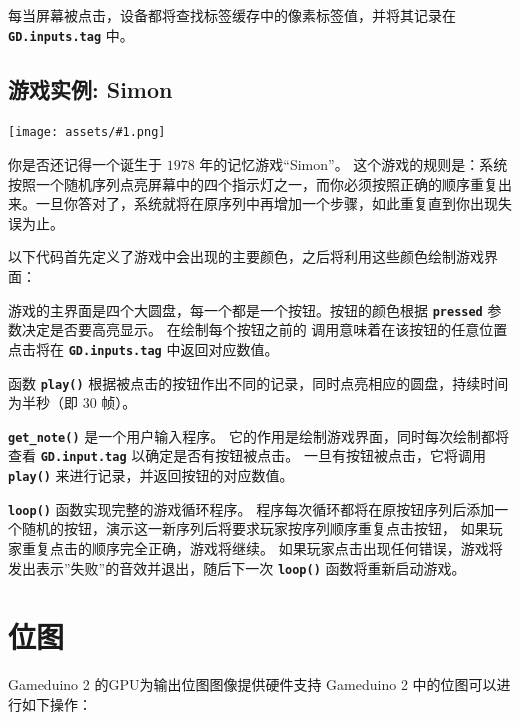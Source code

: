 \documentclass[10pt]{book}
\makeatletter
\newcommand{\gdtwo}{Gameduino 2 }
\newcommand{\png}[1]{
\begin{center}
\texttt{[image: assets/\#1.png]}
\end{center}
}
\newcommand{\mach}[1]{\texttt{\textbf{#1}}}
\newcommand{\cmdidx}[1]{
\index{#1@\mach{#1()}}
}
\newcommand{\dcmd}[1]{\cmdidx{#1}\nameref{#1}}
\makeatother
\begin{document}
\begin{CJK}{UTF8}{gkai}
\vspace{10pt}

\noindent
每当屏幕被点击，设备都将查找标签缓存中的像素标签值，并将其记录在 \mach{GD.inputs.tag} 中。

\cleartoleftpage
\section{游戏实例: Simon}
\label{simon}

\png{simon}

你是否还记得一个诞生于 $1978$ 年的记忆游戏``Simon''。 这个游戏的规则是：系统按照一个随机序列点亮屏幕中的四个指示灯之一，而你必须按照正确的顺序重复出来。一旦你答对了，系统就将在原序列中再增加一个步骤，如此重复直到你出现失误为止。

以下代码首先定义了游戏中会出现的主要颜色，之后将利用这些颜色绘制游戏界面：


\noindent

游戏的主界面是四个大圆盘，每一个都是一个按钮。按钮的颜色根据 \mach{pressed} 参数决定是否要高亮显示。
在绘制每个按钮之前的 \dcmd{Tag} 调用意味着在该按钮的任意位置点击将在 \mach{GD.inputs.tag} 中返回对应数值。

\newpage
{}

函数 \mach{play()} 根据被点击的按钮作出不同的记录，同时点亮相应的圆盘，持续时间为半秒（即 $30$ 帧）。


\mach{get\_note()} 是一个用户输入程序。
它的作用是绘制游戏界面，同时每次绘制都将查看 \mach{GD.input.tag} 以确定是否有按钮被点击。
一旦有按钮被点击，它将调用 \mach{play()} 来进行记录，并返回按钮的对应数值。


\mach{loop()} 函数实现完整的游戏循环程序。
程序每次循环都将在原按钮序列后添加一个随机的按钮，演示这一新序列后将要求玩家按序列顺序重复点击按钮，
如果玩家重复点击的顺序完全正确，游戏将继续。
如果玩家点击出现任何错误，游戏将发出表示''失败''的音效并退出，随后下一次 \mach{loop()} 函数将重新启动游戏。


\chapter{位图}

\gdtwo 的GPU为输出位图图像提供硬件支持
\gdtwo 中的位图可以进行如下操作：


\end{CJK}
\end{document}
